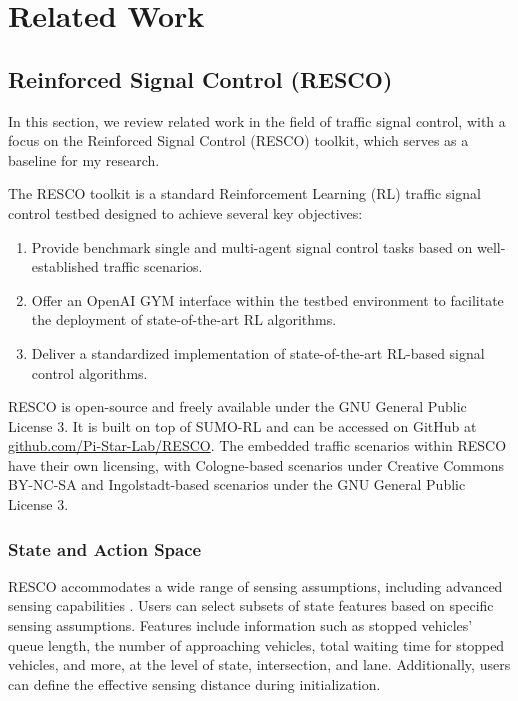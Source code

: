 \chapter{Related Work}
\section{Reinforced Signal Control (RESCO)}
In this section, we review related work in the field of traffic signal control, with a focus on the Reinforced Signal Control (RESCO) toolkit, which serves as a baseline for my research.

The RESCO toolkit is a standard Reinforcement Learning (RL) traffic signal control testbed designed to achieve several key objectives:

\begin{enumerate}
    \item Provide benchmark single and multi-agent signal control tasks based on well-established traffic scenarios.
    \item Offer an OpenAI GYM interface within the testbed environment to facilitate the deployment of state-of-the-art RL algorithms.
    \item Deliver a standardized implementation of state-of-the-art RL-based signal control algorithms.
\end{enumerate}

RESCO is open-source and freely available under the GNU General Public License 3. It is built on top of SUMO-RL \cite{alegre2019sumo-rl} and can be accessed on GitHub at \url{github.com/Pi-Star-Lab/RESCO}. The embedded traffic scenarios within RESCO have their own licensing, with Cologne-based scenarios under Creative Commons BY-NC-SA and Ingolstadt-based scenarios under the GNU General Public License 3.

\subsection{State and Action Space}

RESCO accommodates a wide range of sensing assumptions, including advanced sensing capabilities \cite{codeca2018monaco}. Users can select subsets of state features based on specific sensing assumptions. Features include information such as stopped vehicles' queue length, the number of approaching vehicles, total waiting time for stopped vehicles, and more, at the level of state, intersection, and lane. Additionally, users can define the effective sensing distance during initialization.

